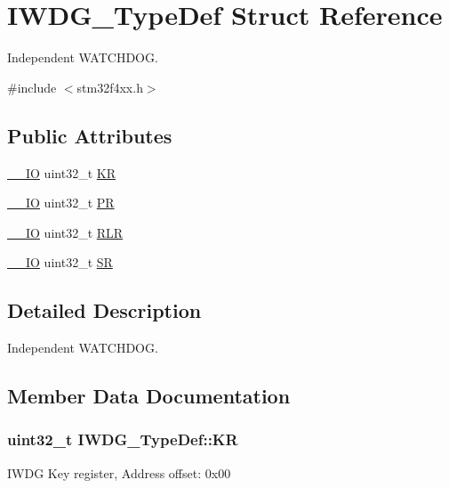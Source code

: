 \hypertarget{struct_i_w_d_g___type_def}{}\section{I\+W\+D\+G\+\_\+\+Type\+Def Struct Reference}
\label{struct_i_w_d_g___type_def}


Independent W\+A\+T\+C\+H\+D\+OG.  




{\ttfamily \#include $<$stm32f4xx.\+h$>$}

\subsection*{Public Attributes}
\begin{DoxyCompactItemize}
\item 
\hyperlink{core__cm4_8h_aec43007d9998a0a0e01faede4133d6be}{\+\_\+\+\_\+\+IO} uint32\+\_\+t \hyperlink{struct_i_w_d_g___type_def_a63089aaa5f4ad34ee2677ebcdee49cd9}{KR}
\item 
\hyperlink{core__cm4_8h_aec43007d9998a0a0e01faede4133d6be}{\+\_\+\+\_\+\+IO} uint32\+\_\+t \hyperlink{struct_i_w_d_g___type_def_a5f2717885ff171e686e0347af9e6b68d}{PR}
\item 
\hyperlink{core__cm4_8h_aec43007d9998a0a0e01faede4133d6be}{\+\_\+\+\_\+\+IO} uint32\+\_\+t \hyperlink{struct_i_w_d_g___type_def_aa3703eaa40e447dcacc69c0827595532}{R\+LR}
\item 
\hyperlink{core__cm4_8h_aec43007d9998a0a0e01faede4133d6be}{\+\_\+\+\_\+\+IO} uint32\+\_\+t \hyperlink{struct_i_w_d_g___type_def_a9bbfbe921f2acfaf58251849bd0a511c}{SR}
\end{DoxyCompactItemize}


\subsection{Detailed Description}
Independent W\+A\+T\+C\+H\+D\+OG. 

\subsection{Member Data Documentation}
\subsubsection[{\texorpdfstring{KR}{KR}}]{ uint32\+\_\+t I\+W\+D\+G\+\_\+\+Type\+Def\+::\+KR}\hypertarget{struct_i_w_d_g___type_def_a63089aaa5f4ad34ee2677ebcdee49cd9}{}\label{struct_i_w_d_g___type_def_a63089aaa5f4ad34ee2677ebcdee49cd9}
I\+W\+DG Key register, Address offset\+: 0x00 
